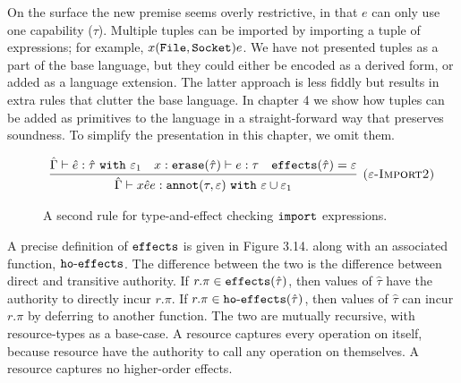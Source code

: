On the surface the new premise seems overly restrictive, in that $e$ can only use one capability ($\tau$). Multiple tuples can be imported by importing a tuple of expressions; for example, ${x}{(\mathtt{File, Socket})}{e}$. We have not presented tuples as a part of the base language, but they could either be encoded as a derived form, or added as a language extension. The latter approach is less fiddly but results in extra rules that clutter the base language. In chapter 4 we show how tuples can be added as primitives to the language in a straight-forward way that preserves soundness. To simplify the presentation in this chapter, we omit them.


\begin{figure}[h]

\[
\begin{array}{c}

\infer[\textsc{($\varepsilon$-Import2)}]
	{ \hat \Gamma \vdash {x}{\hat e}{e}: \kwa{annot}(\tau, \varepsilon)~\kw{with} \varepsilon \cup \varepsilon_1 }
	{ \hat \Gamma \vdash \hat e: \hat \tau~\kw{with} \varepsilon_1 & x: \kwa{erase}(\hat \tau) \vdash e: \tau & \kwa{effects}(\hat \tau) = \varepsilon}

\end{array}
\]
\vspace{-7pt}
\caption{A second rule for type-and-effect checking $\mathtt{import}$ expressions.}
\label{This is the label.}
\end{figure}

A precise definition of $\mathtt{effects}$ is given in Figure 3.14. along with an associated function, $\mathtt{ho \hbox{-} effects}$. The difference between the two is the difference between direct and transitive authority. If $r.\pi \in \mathtt{effects}(\hat \tau)$, then values of $\hat \tau$ have the authority to directly incur $r.\pi$. If $r.\pi \in \mathtt{ho \hbox{-} effects}(\hat \tau)$, then values of $\hat \tau$ can incur $r.\pi$ by deferring to another function. The two are mutually recursive, with resource-types as a base-case. A resource captures every operation on itself, because resource have the authority to call any operation on themselves. A resource captures no higher-order effects.

